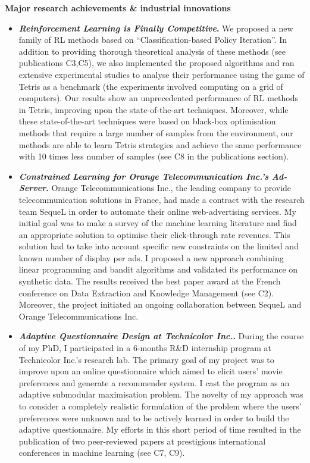\noindent 
\textbf{Major research achievements \& industrial innovations}
\\[-.4cm]\noindent\makebox[\linewidth]{\rule{\columnwidth}{0.4pt}}
\begin{itemize}
\item \textit{\textbf{Reinforcement Learning is Finally Competitive}}\textit{}\textbf{.} We proposed a new family of RL methods based on ``Classification-based Policy Iteration''. In addition to providing thorough theoretical analysis of these methods (see publications C3,C5), we also implemented the proposed algorithms and ran extensive experimental studies to analyse their performance using the game of Tetris as a benchmark (the experiments involved computing on a grid of computers). Our results show an unprecedented performance of RL methods in Tetris, improving upon the state-of-the-art techniques. Moreover, while these state-of-the-art techniques were based on black-box optimisation methods that require a large number of samples from the environment, our methods are able to learn Tetris strategies and achieve the same performance with 10 times less number of samples (see C8 in the publications section).
\item \textit{\textbf{Constrained Learning for Orange Telecommunication Inc.'s Ad-Server}}\textit{}\textbf{.}
Orange Telecommunications Inc., the leading company to provide telecommunication solutions in France, had made a contract with the research team SequeL in order to automate their online web-advertising services. My initial goal was to make a survey of the machine learning literature and find an appropriate solution to optimise their click-through rate revenues. This solution had to take into account specific new constraints on the limited and known number of display per ads. I proposed a new approach combining linear programming and bandit algorithms and validated its performance on synthetic data. The results received the best paper award at the French conference on Data Extraction and Knowledge Management (see C2). Moreover, the project initiated an ongoing collaboration between SequeL and Orange Telecommunications Inc.
\item \textit{\textbf{Adaptive Questionnaire Design at Technicolor Inc.}}\textit{}\textbf{.}
During the course of my PhD, I participated in a 6-months R\&D internship program at Technicolor Inc.'s research lab. The primary goal of my project was to improve upon an online questionnaire which aimed to elicit users' movie preferences and generate a recommender system. I cast the program as an adaptive submodular maximisation problem. 
The novelty of my approach was to consider a completely realistic formulation of the problem where the users' preferences were unknown and to be actively learned in order to build the adaptive questionnaire.  
My efforts in this short period of time resulted in the publication of two peer-reviewed papers at prestigious international conferences in machine learning (see C7, C9). 
\end{itemize}

